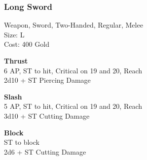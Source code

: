 \subsubsection{Long Sword}\label{weapon:longSword}
Weapon, Sword, Two-Handed, Regular, Melee\\
Size: L\\
Cost: 400 Gold

\textbf{Thrust}\\
6 AP, ST to hit, Critical on 19 and 20,  Reach\\
2d10 + \texttimes ST Piercing Damage

\textbf{Slash}\\
5 AP, ST to hit, Critical on 19 and 20,  Reach\\
3d10 + \texttimes ST Cutting Damage

\textbf{Block}\\
ST to block\\
2d6 + \texttimes ST Cutting Damage